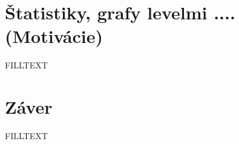 \documentclass[10pt,slovak,a4paper]{article}
\begin{document}
\section {Štatistiky, grafy levelmi .... (Motivácie)} \label{statistics}

FILLTEXT


\section{Záver} \label{end}

FILLTEXT



\end{document}
